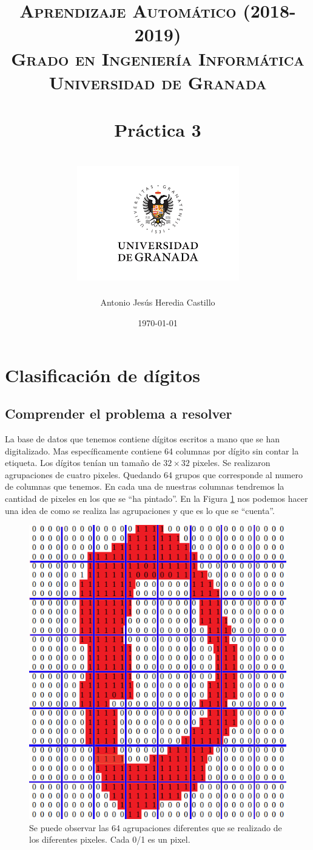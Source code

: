 \documentclass[12pt,a4paper]{article}
\title{
\normalfont \normalsize 
\textsc{{\bf Aprendizaje Automático (2018-2019)} \\ Grado en Ingeniería Informática \\ Universidad de Granada} \\ [25pt] %
\horrule{0.5pt} \\[0.4cm] %
\huge Práctica 3 \\ %
\horrule{2pt} \\[0.5cm] %
\includegraphics{images/logo.png}	
}
\author{Antonio Jesús Heredia Castillo} %
\date{\normalsize\today} %
\begin{document}
\maketitle %
\newpage %
\tableofcontents %
\listoffigures
\listoftables
\newpage

\section{Clasificación de dígitos}
\subsection{Comprender el problema a resolver}
La base de datos que tenemos contiene dígitos escritos a mano que se han digitalizado. Mas específicamente contiene 64 columnas por dígito sin contar la etiqueta. Los dígitos tenían un tamaño de $32\times32$ pixeles. Se realizaron agrupaciones de cuatro pixeles. Quedando 64 grupos que corresponde al numero de columnas que tenemos. En cada una de nuestras columnas tendremos la cantidad de pixeles en los que se ``ha pintado''. En la Figura \ref{fig:digitocuadricula} nos podemos hacer una idea de como se realiza las agrupaciones y que es lo que se ``cuenta''.

\begin{figure}[H]
	\centering
	\includegraphics[scale=0.5]{images/digitoCuadricula}
	\caption[Digito cero representado con 0 y 1.]{Se puede observar las 64 agrupaciones diferentes que se realizado de los diferentes pixeles. Cada 0/1 es un pixel.}
	\label{fig:digitocuadricula}
\end{figure}
\end{document}
